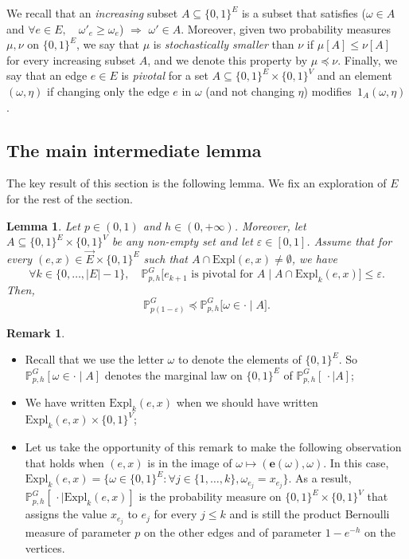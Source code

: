 \documentclass[10pt]{amsart}
\newtheorem{lemm}[theo]{Lemma}
\theoremstyle{definition}
\newtheorem{rema}[theo]{Remark}
\newcommand{\Pro}{\mathbb{P}}
\newcommand{\ee}{\mathbf{e}}
\newcommand{\Expl}{\mathrm{Expl}}
\let\oldforall\forall
\renewcommand*{\forall}{\mathrel{\oldforall}}
\begin{document}
We recall that an \emph{increasing} subset $A\subseteq\{0,1\}^E$ is a subset that satisfies ($\omega \in A$ and $\forall e \in E, \quad \omega'_e \ge \omega_e$) $\Rightarrow$ $\omega'\in A$. Moreover, given two probability measures $\mu,\nu$ on $\{0,1\}^E$, we say that $\mu$ is \emph{stochastically smaller} than $\nu$ if $\mu[A]\le \nu[A]$ for every increasing subset $A$, and we denote this property by $\mu \preceq \nu$. Finally, we say that an edge $e \in E$ is \emph{pivotal} for a set $A \subseteq \{0,1\}^E \times \{0,1\}^V$ and an element~$(\omega,\eta)$ if changing only the edge $e$ in $\omega$ (and not changing $\eta$) modifies~$1_A(\omega,\eta)$.

\subsection{The main intermediate lemma}

The key result of this section is the following lemma. We fix an exploration of $E$ for the rest of the section.

\begin{lemm}\label{lem:coupl}
Let $p \in (0,1)$ and $h \in (0,+\infty)$. Moreover, let $A \subseteq \{0,1\}^E \times \{0,1\}^V$ be any non-empty set and let $\varepsilon \in [0,1]$. Assume that for every $(e,x) \in \vec{E}\times\{0,1\}^E$ such that $A \cap \Expl(e,x)\neq \emptyset$, we have
\[
\forall k \in \{0,\dots,|E|-1\}, \quad \Pro_{p,h}^G \big[\text{$e_{k+1}$ is pivotal for $A$} \; \big| \; A \cap \Expl_k(e,x) \big] \le \varepsilon.
\]
Then,
\[
\Pro_{p(1-\varepsilon)}^G \preceq \Pro_{p,h}^G \big[\omega \in \cdot \; \big| \; A \big].
\]
\end{lemm}

\begin{rema}\label{rk:formal}\leavevmode
\begin{itemize}
\item Recall that we use the letter $\omega$ to denote the elements of $\{0,1\}^E$. So $\Pro_{p,h}^G [\omega \in \cdot \mid A]$ denotes the marginal law on $\{0,1\}^E$ of $\Pro_{p,h}^G[\, \cdot \mid A]$;
\item We have written $\Expl_k(e,x)$ when we should have written $\Expl_k(e,x) \times \{0,1\}^V$;
\item Let us take the opportunity of this remark to make the following observation that holds when $(e,x)$ is in the image of $\omega \mapsto (\ee(\omega),\omega)$. In this case, $\Expl_k(e,x)=\{\omega \in \{0,1\}^E : \forall j \in \{1,\dots,k\}, \omega_{e_j}=x_{e_j}\}$. As a result, $\Pro_{p,h}^G [\, \cdot \mid \Expl_k(e,x)]$ is the probability measure on $\{0,1\}^E\times\{0,1\}^V$ that assigns the value $x_{e_j}$ to $e_j$ for every $j \le k$ and is still the product Bernoulli measure of parameter $p$ on the other edges and of parameter $1-e^{-h}$ on the vertices.
\end{itemize}
\end{rema}
\end{document}
